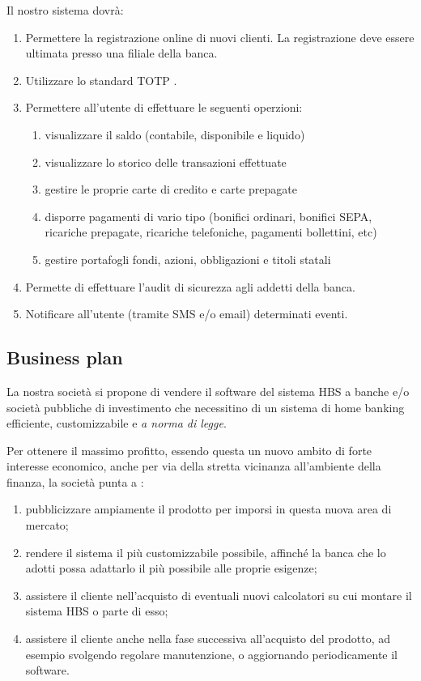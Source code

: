 \documentclass[10pt]{softeng} %
\begin{document}
Il nostro sistema dovr\`a:
\begin{enumerate}
	\item Permettere la registrazione online di nuovi clienti.
		La registrazione deve essere ultimata presso una filiale della banca.
	\item Utilizzare lo standard TOTP \cite{totprfc}.
	\item Permettere all'utente di effettuare le seguenti operzioni:
		\begin{enumerate}
			\item visualizzare il saldo (contabile, disponibile e liquido)
			\item visualizzare lo storico delle transazioni effettuate
			\item gestire le proprie carte di credito e carte prepagate
			\item disporre pagamenti di vario tipo (bonifici ordinari, bonifici SEPA, ricariche prepagate, ricariche telefoniche, pagamenti bollettini, etc)
			\item gestire portafogli fondi, azioni, obbligazioni e titoli statali %
		\end{enumerate}
	\item Permette di effettuare l'audit di sicurezza agli addetti della banca.
	\item Notificare all'utente (tramite SMS e/o email) determinati eventi.
\end{enumerate}

\subsection{Business plan}

La nostra società si propone di vendere il software del sistema HBS a banche e/o società pubbliche di investimento che necessitino di un sistema di home banking efficiente, customizzabile e \emph{a norma di legge}.

Per ottenere il massimo profitto, essendo questa un nuovo ambito di forte interesse economico, anche per via della stretta vicinanza all'ambiente della finanza, la società punta a :
\begin{enumerate}
	\item pubblicizzare ampiamente il prodotto per imporsi in questa nuova area di mercato;
	\item rendere il sistema il più customizzabile possibile, affinch\'e la banca che lo adotti possa adattarlo il più possibile alle proprie esigenze;
	\item assistere il cliente nell'acquisto di eventuali nuovi calcolatori su cui montare il sistema HBS o parte di esso;
	\item assistere il cliente anche nella fase successiva all'acquisto del prodotto, ad esempio svolgendo regolare manutenzione, o aggiornando periodicamente il software.
\end{enumerate}
\end{document}
